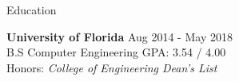 \documentclass{resume} %
\begin{document}

\begin{rSection}{Education}

{\bf University of Florida} \hfill {Aug 2014 - May 2018} 
\\ B.S Computer Engineering \hfill {GPA: 3.54 / 4.00}
\\ Honors: \textit{College of Engineering Dean's List}  

\end{rSection}

\end{document}
